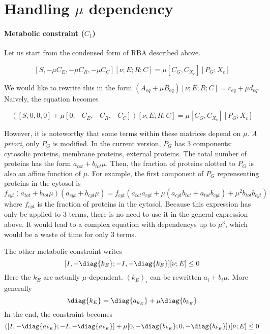 \section{Handling $\mu$ dependency} 

\paragraph{Metabolic constraint ($C_1$)} Let us start from the condensed form of RBA described above.

\[
[S, -\mu C_E, -\mu C_R, -\mu C_C][\nu;E;R;C] = \mu [C_G,C_{X_c}][P_G;X_c]
\]

We would like to rewrite this in the form $(A_{eq} + \mu B_{eq})[\nu;E;R;C] = c_{eq} + \mu d_{eq}$. Naively, the equation becomes

\[
([S, 0,0,0] + \mu [0, -C_E,-C_R,-C_C])[\nu;E;R;C] = \mu [C_G,C_{X_c}] [P_G;X_c]
\]

However, it is noteworthy that some terms within these matrices depend on $\mu$. \textit{A priori}, only $P_G$ is modified. In the current version, $P_G$ has 3 components: cytosolic proteins, membrane proteins, external proteins. The total number of proteins has the form $a_{tot}+b_{tot}\mu$. Then, the fraction of proteins alotted to $P_G$ is also an affine function of $\mu$. For example, the first component of $P_G$ reprensenting proteins in the cytosol is
\[
f_{cyt} (a_{tot} + b_{tot} \mu)(a_{cyt} + b_{cyt}\mu) 
= f_{cyt} (a_{tot} a_{cyt} + \mu (a_{cyt}b_{tot}+a_{tot}b_{cyt})+ \mu^2 b_{tot} b_{cyt})
\]
where $f_{cyt}$ is the fraction of proteins in the cytosol. Because this expression has only be applied to 3 terms, there is no need to use it in the general expression above. It would lead to a complex equation with dependencys up to $\mu^3$, which would be a waste of time for only 3 terms.

The other metabolic constraint writes
\[
  [I,-\diag{k_E};-I,-\diag{k_E}][\nu;E] \leq 0
\]
Here the $k_E$ are actually $\mu$-dependent. $(k_E)_i$ can be rewritten $a_i+b_i\mu$. More generally
\[
\diag{k_E} =\diag{a_{k_E}} + \mu\diag{b_{k_E}}
\]
In the end, the constraint becomes
\[
([I,-\diag{a_{k_E}};-I,-\diag{a_{k_E}}]
+ \mu [0,-\diag{b_{k_E}};0,-\diag{b_{k_E}}])
[\nu; E] \leq 0
\]

